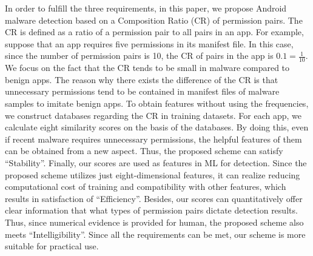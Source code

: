 \documentclass{ieeeaccess}
\newcommand{\ti}{Android malware detection based on composition ratio of permission pairs}
\begin{document}
In order to fulfill the three requirements, in this paper, we propose Android malware detection based on a Composition Ratio (CR) of permission pairs.
The CR is defined as a ratio of a permission pair to all pairs in an app.
For example, suppose that an app requires five permissions in its manifest file.
In this case, since the number of permission pairs is 10, the CR of pairs in the app is $0.1 = \frac{1}{10}$.
We focus on the fact that the CR tends to be small in malware compared to benign apps.
The reason why there exists the difference of the CR is that unnecessary permissions tend to be contained in manifest files of malware samples to imitate benign apps.
To obtain features without using the frequencies, we construct databases regarding the CR in training datasets.
For each app, we calculate eight similarity scores on the basis of the databases.
By doing this, even if recent malware requires unnecessary permissions, the helpful features of them can be obtained from a new aspect.
Thus, the proposed scheme can satisfy ``Stability''.
Finally, our scores are used as features in ML for detection.
Since the proposed scheme utilizes just eight-dimensional features, it can realize reducing computational cost of training and compatibility with other features, which results in satisfaction of ``Efficiency''.  
Besides, our scores can quantitatively offer clear information that what types of permission pairs dictate detection results.
Thus, since numerical evidence is provided for human, the proposed scheme also meets ``Intelligibility''.
Since all the requirements can be met, our scheme is more suitable for practical use.
\end{document}
